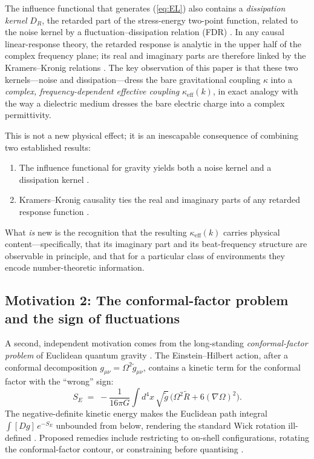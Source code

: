 \documentclass[12pt,a4paper]{article}
\begin{document}
The influence functional that generates (\ref{eq:EL}) also contains a \emph{dissipation kernel} $D_{R}$, the retarded part of the stress-energy two-point function, related to the noise kernel by a fluctuation--dissipation relation (FDR) \cite{HuVerdaguer2008}.
In any causal linear-response theory, the retarded response is analytic in the upper half of the complex frequency plane; its real and imaginary parts are therefore linked by the Kramers--Kronig relations \cite{KramersKronig}.
The key observation of this paper is that these two kernels---noise and dissipation---dress the bare gravitational coupling $\kappa$ into a \emph{complex, frequency-dependent effective coupling} $\kappa_{\mathrm{eff}}(k)$, in exact analogy with the way a dielectric medium dresses the bare electric charge into a complex permittivity.

This is not a new physical effect; it is an inescapable consequence of combining two established results:
\begin{enumerate}
\item The influence functional for gravity yields both a noise kernel and a dissipation kernel \cite{HuVerdaguer2004}.
\item Kramers--Kronig causality ties the real and imaginary parts of any retarded response function \cite{KramersKronig}.
\end{enumerate}
What \emph{is} new is the recognition that the resulting $\kappa_{\mathrm{eff}}(k)$ carries physical content---specifically, that its imaginary part and its beat-frequency structure are observable in principle, and that for a particular class of environments they encode number-theoretic information.


\subsection{Motivation 2: The conformal-factor problem and the sign of fluctuations}\label{sec:mot2}

A second, independent motivation comes from the long-standing \emph{conformal-factor problem} of Euclidean quantum gravity \cite{GibbonsHawkingPerry1978,Mazur1990}.
The Einstein--Hilbert action, after a conformal decomposition $g_{\mu\nu}=\Omega^{2}\tilde{g}_{\mu\nu}$, contains a kinetic term for the conformal factor with the ``wrong'' sign:
\begin{equation}\label{eq:SEconformal}
  S_{E} \;=\; -\frac{1}{16\pi G}\int d^{4}x\,\sqrt{\tilde{g}}\,\bigl(\Omega^{2}\tilde{R}+6(\nabla\Omega)^{2}\bigr).
\end{equation}
The negative-definite kinetic energy makes the Euclidean path integral $\int[Dg]\,e^{-S_{E}}$ unbounded from below, rendering the standard Wick rotation ill-defined \cite{ConformalInstability2022}.
Proposed remedies include restricting to on-shell configurations, rotating the conformal-factor contour, or constraining before quantising \cite{GravPI_UCSB}.
\end{document}
